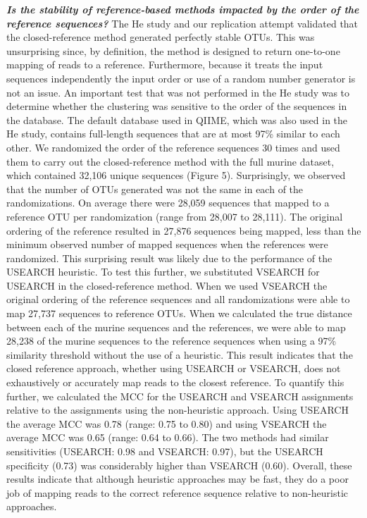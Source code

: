 \documentclass[11pt,]{article}
\begin{document}
\textbf{\emph{Is the stability of reference-based methods impacted by
the order of the reference sequences?}} The He study and our replication
attempt validated that the closed-reference method generated perfectly
stable OTUs. This was unsurprising since, by definition, the method is
designed to return one-to-one mapping of reads to a reference.
Furthermore, because it treats the input sequences independently the
input order or use of a random number generator is not an issue. An
important test that was not performed in the He study was to determine
whether the clustering was sensitive to the order of the sequences in
the database. The default database used in QIIME, which was also used in
the He study, contains full-length sequences that are at most 97\%
similar to each other. We randomized the order of the reference
sequences 30 times and used them to carry out the closed-reference
method with the full murine dataset, which contained 32,106 unique
sequences (Figure 5). Surprisingly, we observed that the number of OTUs
generated was not the same in each of the randomizations. On average
there were 28,059 sequences that mapped to a reference OTU per
randomization (range from 28,007 to 28,111). The original ordering of
the reference resulted in 27,876 sequences being mapped, less than the
minimum observed number of mapped sequences when the references were
randomized. This surprising result was likely due to the performance of
the USEARCH heuristic. To test this further, we substituted VSEARCH for
USEARCH in the closed-reference method. When we used VSEARCH the
original ordering of the reference sequences and all randomizations were
able to map 27,737 sequences to reference OTUs. When we calculated the
true distance between each of the murine sequences and the references,
we were able to map 28,238 of the murine sequences to the reference
sequences when using a 97\% similarity threshold without the use of a
heuristic. This result indicates that the closed reference approach,
whether using USEARCH or VSEARCH, does not exhaustively or accurately
map reads to the closest reference. To quantify this further, we
calculated the MCC for the USEARCH and VSEARCH assignments relative to
the assignments using the non-heuristic approach. Using USEARCH the
average MCC was 0.78 (range: 0.75 to 0.80) and using VSEARCH the average
MCC was 0.65 (range: 0.64 to 0.66). The two methods had similar
sensitivities (USEARCH: 0.98 and VSEARCH: 0.97), but the USEARCH
specificity (0.73) was considerably higher than VSEARCH (0.60). Overall,
these results indicate that although heuristic approaches may be fast,
they do a poor job of mapping reads to the correct reference sequence
relative to non-heuristic approaches.
\end{document}
